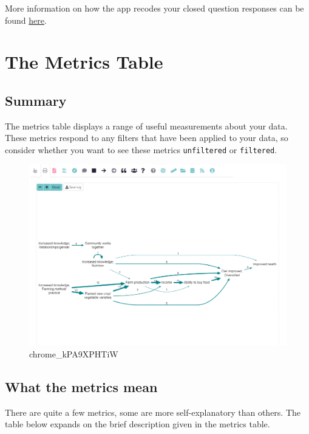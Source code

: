 \documentclass[
]{book}
\begin{document}
More information on how the app recodes your closed question responses can be found \href{https://guide.causalmap.app/importing-your-data-special-cases.html?q=recodes\#quip-recodes-for-closed-questions---live-link}{here}.

\hypertarget{xmetrics-old}{%
\chapter{The Metrics Table}\label{xmetrics-old}}

\hypertarget{summary-1}{%
\section{Summary}\label{summary-1}}

The metrics table displays a range of useful measurements about your data. These metrics respond to any filters that have been applied to your data, so consider whether you want to see these metrics \texttt{unfiltered} or \texttt{filtered}.

\begin{figure}
\centering
\includegraphics[width=6.77083in,height=\textheight]{_assets/chrome_kPA9XPHTiW.gif}
\caption{chrome\_kPA9XPHTiW}
\end{figure}

\hypertarget{what-the-metrics-mean}{%
\section{What the metrics mean}\label{what-the-metrics-mean}}

There are quite a few metrics, some are more self-explanatory than others. The table below expands on the brief description given in the metrics table.
\end{document}
